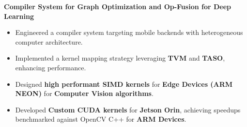 \documentclass[10pt,a4]{article}
\begin{document}
{\begin{flushleft}
\begin{itemize}
        \end{itemize}
        \item \hspace{1.5mm} \textbf{\large Compiler System for Graph Optimization and Op-Fusion for Deep Learning}
        \vspace{0.25mm}
        \begin{itemize}
            \item Engineered a compiler system targeting mobile backends with heterogeneous computer architecture.
            \item Implemented a kernel mapping strategy leveraging \textbf{TVM} and \textbf{TASO}, enhancing performance.
            \item Designed \textbf{high performant SIMD kernels} for \textbf{Edge Devices (ARM NEON)} for \textbf{Computer Vision algorithms}.
            \item Developed \textbf{Custom CUDA kernels} for \textbf{Jetson Orin}, achieving speedups benchmarked against OpenCV C++ for \textbf{ARM Devices}.
        \end{itemize}



\end{flushleft}}
\end{document}
